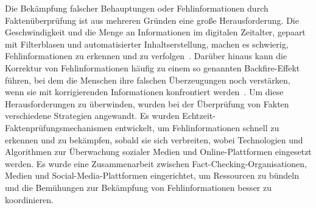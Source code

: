 \documentclass[a4paper,listof=totoc,bibliography=totoc]{scrartcl}
\begin{document}

Die Bekämpfung falscher Behauptungen oder Fehlinformationen durch Faktenüberprüfung ist aus mehreren Gründen eine große Herausforderung. Die Geschwindigkeit und die 
Menge an Informationen im digitalen Zeitalter, gepaart mit Filterblasen und automatisierter Inhaltserstellung, machen es schwierig, Fehlinformationen zu erkennen und 
zu verfolgen~\cite{lewandowsky2020}. Darüber hinaus kann die Korrektur von Fehlinformationen häufig zu einem so genannten Backfire-Effekt führen, bei dem die 
Menschen ihre falschen Überzeugungen noch verstärken, wenn sie mit korrigierenden Informationen konfrontiert werden~\cite{nyhan2010}. Um diese Herausforderungen zu 
überwinden, wurden bei der Überprüfung von Fakten verschiedene Strategien angewandt. Es wurden Echtzeit-Faktenprüfungsmechanismen entwickelt, um Fehlinformationen 
schnell zu erkennen und zu bekämpfen, sobald sie sich verbreiten, wobei Technologien und Algorithmen zur Überwachung sozialer Medien und Online-Plattformen 
eingesetzt werden. Es wurde eine Zusammenarbeit zwischen Fact-Checking-Organisationen, Medien und Social-Media-Plattformen eingerichtet, um Ressourcen zu bündeln 
und die Bemühungen zur Bekämpfung von Fehlinformationen besser zu koordinieren.\newline
\end{document}
